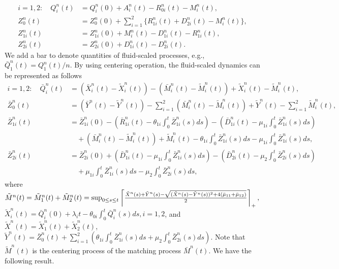 \begin{align}
i = 1,2: \quad
Q_i^n(t) &= Q_i^n(0) + A_i^n(t) - R_{0i}^n(t) - M_i^n(t), \label{eq:EC35} \\
Z^n_0(t) &= Z^n_0(0) + \sum_{i=1}^{2} \{R^n_{1i}(t) + D^n_{2i}(t) - M_i^n(t)\}, \label{eq:EC36} \\
Z^n_{1i}(t) &= Z^n_{1i}(0) + M_i^n(t) - D^n_{1i}(t) - R^n_{1i}(t), \label{eq:EC37} \\
Z^n_{2i}(t) &= Z^n_{2i}(0) + D^n_{1i}(t) - D^n_{2i}(t). \label{eq:EC38}
\end{align}
We add a bar to denote quantities of fluid-scaled processes, e.g., $\bar{Q}_1^n(t) = Q_1^n(t)/n$.
By using centering operation, the fluid-scaled dynamics can be represented as follows
\begin{align}
    i = 1,2: \quad
\bar{Q}_i^n(t) &= (\bar{X}^n_i(t)-\tilde{X}_i^n(t)) - (\bar{M}_i^n(t) - \tilde{M}_i^n(t)) + \tilde{X}_i^n(t) - \tilde{M}_i^n(t), \label{eq:EC39b} \\
\bar{Z}^n_0(t) &= (\bar{Y}^n(t) - \tilde{Y}^n(t)) - \sum_{i=1}^{2}(\bar{M}_i^n(t) - \tilde{M}_i^n(t)) + \tilde{Y}^n(t) - \sum_{i=1}^{2}\tilde{M}_i^n(t), \label{eq:EC40b} \\
\bar{Z}^n_{1i}(t) &= \bar{Z}^n_{1i}(0) - (\bar{R}^n_{1i}(t) - \theta_{1i} \int_0^t \bar{Z}^n_{1i}(s)ds) - (\bar{D}^n_{1i}(t) - \mu_{1i} \int_0^t \bar{Z}^n_{1i}(s)ds) \nonumber \\
& \quad + (\bar{M}^n_{i}(t) - \tilde{M}^n_{i}(t)) + \tilde{M}^n_{i}(t) - \theta_{1i} \int_0^t \bar{Z}^n_{1i}(s)ds - \mu_{1i} \int_0^t \bar{Z}^n_{1i}(s)ds, \label{eq:EC41b} \\
\bar{Z}^n_{2i}(t) &= \bar{Z}^n_{2i}(0) + (\bar{D}^n_{1i}(t) - \mu_{1i} \int_0^t \bar{Z}^n_{1i}(s)ds) - (\bar{D}^n_{2i}(t) - \mu_2 \int_0^t \bar{Z}^n_{2i}(s)ds) \nonumber \\
& \quad + \mu_{1i} \int_0^t \bar{Z}^n_{1i}(s)ds - \mu_2 \int_0^t \bar{Z}^n_{2i}(s)ds, \label{eq:EC42b}
\end{align}
where $\tilde{M}^n(t)= \tilde{M}_1^n(t)+\tilde{M}_2^n(t)= \sup_{0 \le s \le t} \left\lceil \frac{\tilde{X}^n(s) + \tilde{Y}^n(s) - \sqrt{(\tilde{X}^n(s) - \tilde{Y}^n(s))^2 + 4(\bar{\mu}_{11}+\bar{\mu}_{12})}}{2} \right\rceil_+,$
$\tilde{X}^n_i(t) = \bar{Q}_i^n(0) + \lambda_i t - \theta_{0i} \int_0^t \bar{Q}_i^n(s)ds,i =1,2$, and $\tilde{X}^n(t)=\tilde{X}^n_1(t)+\tilde{X}^n_2(t)$, $\tilde{Y}^n(t) = \bar{Z}^n_0(t) + \sum_{i=1}^{2}(\theta_{1i} \int_0^t \bar{Z}^n_{1i}(s)ds + \mu_2 \int_0^t \bar{Z}^n_{2i}(s)ds).$
Note that $\tilde{M}^n(t)$ is the centering process of the matching process $\bar{M}^n(t)$.
We have the following result.

